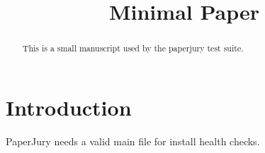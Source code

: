 \documentclass{article}
\title{Minimal Paper}
\begin{document}
\maketitle
\begin{abstract}
This is a small manuscript used by the paperjury test suite.
\end{abstract}
\section{Introduction}
\label{sec:intro}
PaperJury needs a valid main file for install health checks.
\end{document}
